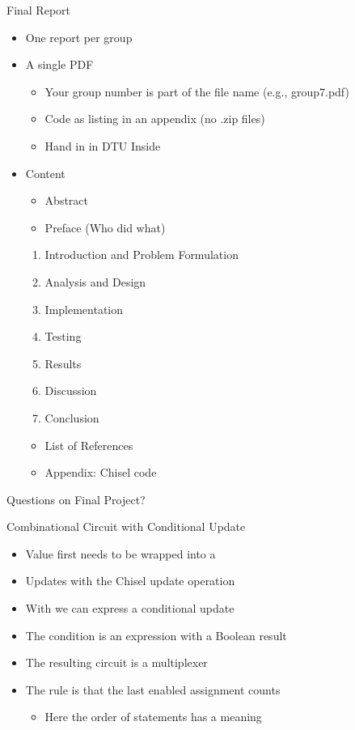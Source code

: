 \begin{frame}[fragile]{Final Report}
\begin{itemize}
\item One report per group
\item A single PDF
\begin{itemize}
\item Your group number is part of the file name (e.g., group7.pdf)
\item Code as listing in an appendix (no .zip files)
\item Hand in in DTU Inside
\end{itemize}
\item Content
\begin{itemize}
\item Abstract
\item Preface (Who did what)
\end{itemize}
\begin{enumerate}
\item Introduction and Problem Formulation
\item Analysis and Design
\item Implementation
\item Testing
\item Results
\item Discussion
\item Conclusion
\end{enumerate}
\begin{itemize}
\item List of References
\item Appendix: Chisel code
\end{itemize}
\end{itemize}
\end{frame}

\begin{frame}[fragile]{Questions on Final Project?}
\end{frame}

\begin{frame}[fragile]{Combinational Circuit with Conditional Update}
\begin{itemize}
\item Value first needs to be wrapped into a 
\item Updates with the Chisel update operation \code{:=}
\item With  we can express a conditional update
\item The condition is an expression with a Boolean result
\item The resulting circuit is a multiplexer
\item The rule is that the last enabled assignment counts
\begin{itemize}
\item Here the order of statements has a meaning
\end{itemize}
\end{itemize}
\end{frame}

